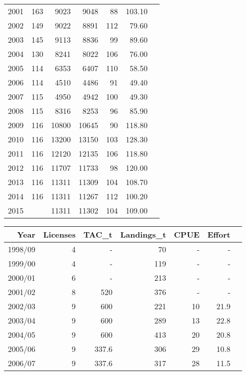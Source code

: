 \documentclass[paper=a4, fontsize=11pt]{article}
\begin{document}
\begin{table}[h]
\begin{tabular}{rrrrrrr}
2001 & 163 & 9023 & 9048 &  88 & 103.10 \\ 
2002 & 149 & 9022 & 8891 & 112 & 79.60 \\ 
2003 & 145 & 9113 & 8836 &  99 & 89.60 \\ 
2004 & 130 & 8241 & 8022 & 106 & 76.00 \\ 
2005 & 114 & 6353 & 6407 & 110 & 58.50 \\ 
2006 & 114 & 4510 & 4486 &  91 & 49.40 \\ 
2007 & 115 & 4950 & 4942 & 100 & 49.30 \\ 
2008 & 115 & 8316 & 8253 &  96 & 85.90 \\ 
2009 & 116 & 10800 & 10645 &  90 & 118.80 \\ 
2010 & 116 & 13200 & 13150 & 103 & 128.30 \\ 
2011 & 116 & 12120 & 12135 & 106 & 118.80 \\ 
2012 & 116 & 11707 & 11733 &  98 & 120.00 \\ 
2013 & 116 & 11311 & 11309 & 104 & 108.70 \\ 
2014 & 116 & 11311 & 11267 & 112 & 100.20 \\ 
2015 &  & 11311 & 11302 & 104 & 109.00 \\ 
   \hline
\end{tabular}
\newline
\vspace*{0.5cm}
\begin{center}
\begin{tabular}{rrrrrrr}
  \hline
Year & Licenses & TAC\_t & Landings\_t & CPUE & Effort \\ 
  \hline
1998/09 &   4 & - &  70 & - & - \\ 
1999/00 &   4 & - & 119 & - & - \\ 
2000/01 &   6 & - & 213 & - & - \\ 
2001/02 &   8 & 520 & 376 & - & - \\ 
2002/03 &   9 & 600 & 221 & 10 & 21.9 \\ 
2003/04 &   9 & 600 & 289 & 13 & 22.8 \\ 
2004/05 &   9 & 600 & 413 & 20 & 20.8 \\ 
2005/06 &   9 & 337.6 & 306 & 29 & 10.8 \\ 
2006/07 &   9 & 337.6 & 317 & 28 & 11.5 \\ 

\end{tabular}
\end{center}
\end{table}
\end{document}
